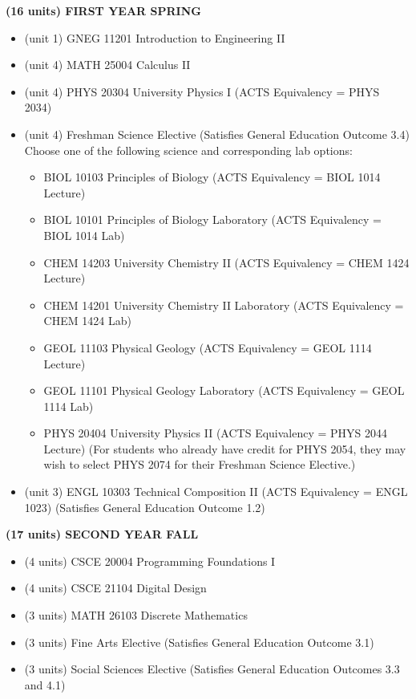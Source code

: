\documentclass{article}
\begin{document}
\textbf{(16 units) FIRST YEAR SPRING}
	\begin{itemize}
		\item (unit 1) GNEG 11201 Introduction to Engineering II
		\item (unit 4) MATH 25004 Calculus II
		\item (unit 4) PHYS 20304 University Physics I (ACTS Equivalency = PHYS 2034)
		\item (unit 4) Freshman Science Elective (Satisfies General Education Outcome 3.4) Choose one of the following science and corresponding lab options:
			\begin{itemize}
				\item BIOL 10103 Principles of Biology (ACTS Equivalency = BIOL 1014 Lecture)
				\item BIOL 10101 Principles of Biology Laboratory (ACTS Equivalency = BIOL 1014 Lab)
				\item CHEM 14203 University Chemistry II (ACTS Equivalency = CHEM 1424 Lecture)
				\item CHEM 14201 University Chemistry II Laboratory (ACTS Equivalency = CHEM 1424 Lab)
				\item GEOL 11103 Physical Geology (ACTS Equivalency = GEOL 1114 Lecture)
				\item GEOL 11101 Physical Geology Laboratory (ACTS Equivalency = GEOL 1114 Lab)
				\item PHYS 20404 University Physics II (ACTS Equivalency = PHYS 2044 Lecture) (For students who already have credit for PHYS 2054, they may wish to select PHYS 2074 for their Freshman Science Elective.)
			\end{itemize}
		\item (unit 3) ENGL 10303 Technical Composition II (ACTS Equivalency = ENGL 1023) (Satisfies General Education Outcome 1.2)
	\end{itemize}

\textbf{(17 units) SECOND YEAR FALL}
	\begin{itemize}
		\item (4 units) CSCE 20004 Programming Foundations I
		\item (4 units) CSCE 21104 Digital Design
		\item (3 units) MATH 26103 Discrete Mathematics
		\item (3 units) Fine Arts Elective (Satisfies General Education Outcome 3.1)
		\item (3 units) Social Sciences Elective (Satisfies General Education Outcomes 3.3 and 4.1)
	\end{itemize}
\end{document}
